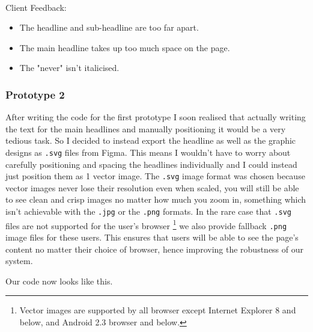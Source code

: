 {\color{gray} \hrulefill} \\ \vspace{0.2cm}

{\sffamily Client Feedback:} 
\begin{itemize}
  \item The headline and sub-headline are too far apart.
  \item The main headline takes up too much space on the page.
  \item The "never" isn't italicised.
\end{itemize}

{\color{gray} \hrulefill} 

\subsubsection{Prototype 2}

After writing the code for the first prototype I soon realised
that actually writing the text for the main headlines and 
manually positioning it would be a very tedious task. So I 
decided to instead export the headline as well as the graphic 
designs as \texttt{.svg} files from Figma. This means I
wouldn't have to worry about carefully positioning and spacing
the headlines individually and I could instead just position 
them as 1 vector image. The \texttt{.svg} image format was 
chosen because vector images never lose their resolution even
when scaled, you will still be able to see clean and crisp 
images no matter how much you zoom in, something which isn't
achievable with the \texttt{.jpg} or the \texttt{.png} formats.
In the rare case that \texttt{.svg} files are not supported
for the user's browser \footnote{Vector images are supported
by all browser except Internet Explorer 8 and below, and 
Android 2.3 browser and below.} we also provide fallback 
\texttt{.png} image files for these users. This ensures that 
users will be able to see the page's content no matter their 
choice of browser, hence improving the robustness of our
system.\\ \vspace{0.2cm}

Our code now looks like this.

